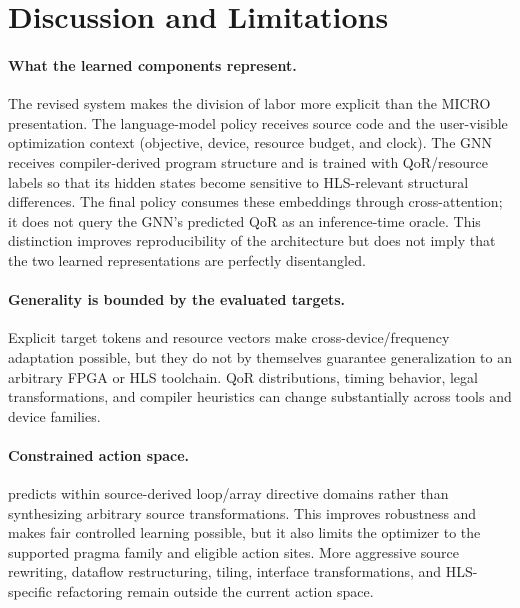 \section{Discussion and Limitations}
\label{sec:limitations}

\paragraph{What the learned components represent.}
The revised system makes the division of labor more explicit than the MICRO presentation. The language-model policy receives source code and the user-visible optimization context (objective, device, resource budget, and clock). The GNN receives compiler-derived program structure and is trained with QoR/resource labels so that its hidden states become sensitive to HLS-relevant structural differences. The final policy consumes these embeddings through cross-attention; it does not query the GNN's predicted QoR as an inference-time oracle. This distinction improves reproducibility of the architecture but does not imply that the two learned representations are perfectly disentangled.

\paragraph{Generality is bounded by the evaluated targets.}
Explicit target tokens and resource vectors make cross-device/frequency adaptation possible, but they do not by themselves guarantee generalization to an arbitrary FPGA or HLS toolchain. QoR distributions, timing behavior, legal transformations, and compiler heuristics can change substantially across tools and device families. 

\paragraph{Constrained action space.}
\framework predicts within source-derived loop/array directive domains rather than synthesizing arbitrary source transformations. This improves robustness and makes fair controlled learning possible, but it also limits the optimizer to the supported pragma family and eligible action sites. More aggressive source rewriting, dataflow restructuring, tiling, interface transformations, and HLS-specific refactoring remain outside the current action space.

